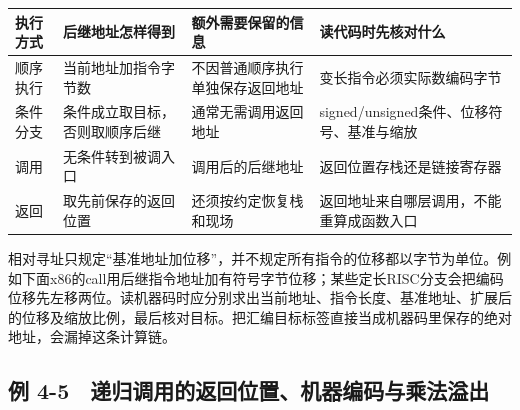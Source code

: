 \begin{wideblock}\par\medskip\noindent\begin{minipage}{\linewidth}\fontsize{9.3}{12}\selectfont\begin{tabularx}{\linewidth}{@{}YYYY@{}}
\toprule\noalign{}
\begin{minipage}[b]{\linewidth}\raggedright
执行方式
\end{minipage} & \begin{minipage}[b]{\linewidth}\raggedright
后继地址怎样得到
\end{minipage} & \begin{minipage}[b]{\linewidth}\raggedright
额外需要保留的信息
\end{minipage} & \begin{minipage}[b]{\linewidth}\raggedright
读代码时先核对什么
\end{minipage} \\
\midrule\noalign{}


顺序执行 & 当前地址加指令字节数 & 不因普通顺序执行单独保存返回地址 & 变长指令必须实际数编码字节 \\
条件分支 & 条件成立取目标，否则取顺序后继 & 通常无需调用返回地址 & signed/unsigned条件、位移符号、基准与缩放 \\
调用 & 无条件转到被调入口 & 调用后的后继地址 & 返回位置存栈还是链接寄存器 \\
返回 & 取先前保存的返回位置 & 还须按约定恢复栈和现场 & 返回地址来自哪层调用，不能重算成函数入口 \\
\bottomrule\end{tabularx}
\end{minipage}\par\medskip\end{wideblock}

相对寻址只规定``基准地址加位移''，并不规定所有指令的位移都以字节为单位。例如下面x86的call用后继指令地址加有符号字节位移；某些定长RISC分支会把编码位移先左移两位。读机器码时应分别求出当前地址、指令长度、基准地址、扩展后的位移及缩放比例，最后核对目标。把汇编目标标签直接当成机器码里保存的绝对地址，会漏掉这条计算链。

\subsection{例 4-5　递归调用的返回位置、机器编码与乘法溢出}\label{CO04-14}

